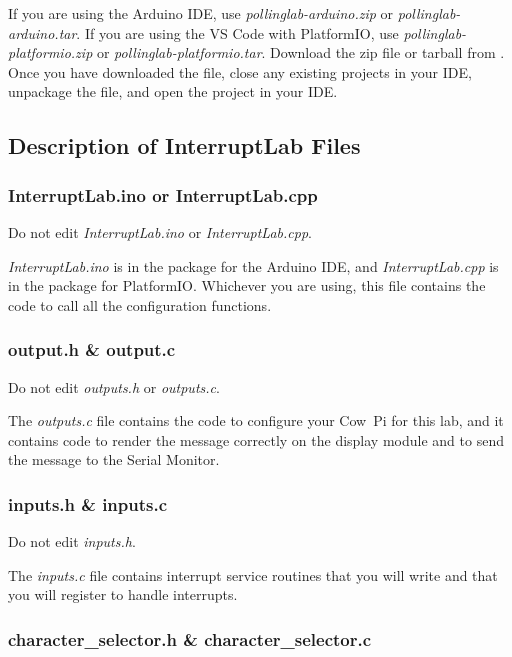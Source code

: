If you are using the Arduino IDE, use \textit{pollinglab-arduino.zip} or \textit{pollinglab-arduino.tar}.
If you are using the VS Code with PlatformIO, use \textit{pollinglab-platformio.zip} or \textit{pollinglab-platformio.tar}.
Download the zip file or tarball from \filesource.
Once you have downloaded the file, close any existing projects in your IDE, unpackage the file, and open the project in your IDE\@.

\subsection{Description of InterruptLab Files}

\subsubsection{InterruptLab.ino or InterruptLab.cpp}

Do not edit \textit{InterruptLab.ino} or \textit{InterruptLab.cpp}.

\textit{InterruptLab.ino} is in the package for the Arduino IDE, and \textit{InterruptLab.cpp} is in the package for PlatformIO\@.
Whichever you are using, this file contains the code to call all the configuration functions.

\subsubsection{output.h \& output.c}

Do not edit \textit{outputs.h} or \textit{outputs.c}.

The \textit{outputs.c} file contains the code to configure your Cow~Pi for this lab,
and it contains code to render the message correctly on the display module and to send the message to the Serial Monitor.

\subsubsection{inputs.h \& inputs.c}

Do not edit \textit{inputs.h}.

The \textit{inputs.c} file contains interrupt service routines that you will write and that you will register to handle interrupts.

\subsubsection{character\_selector.h \& character\_selector.c}


